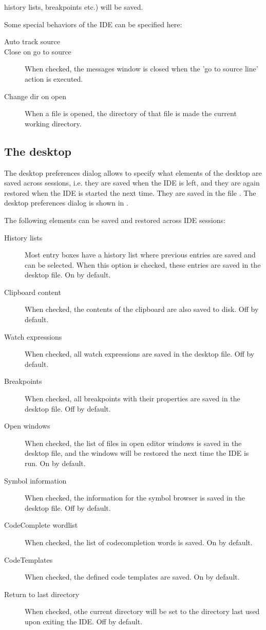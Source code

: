 \begin{description}
\begin{description}
history lists, breakpoints etc.) will be saved.
\end{description}
\item[Options]
Some special behaviors of the IDE can be specified here:
\begin{description}
\item[Auto track source]
\item[Close on go to source] When checked, the messages window is closed
when the 'go to source line' action is executed.
\item[Change dir on open] When a file is opened, the directory of that file
is made the current working directory.
\end{description}
\end{description}
%
%
\subsection{The desktop}
\label{se:prefdesktop}
The desktop preferences dialog allows to specify what elements of the
desktop are saved across sessions, i.e. they are saved when the IDE is left,
and they are again restored when the IDE is started the next time.
They are saved in the file .
The desktop preferences dialog is shown in .


The following elements can be saved and restored across IDE sessions:
\begin{description}
\item[History lists] Most entry boxes have a history list where previous
entries are saved and can be selected. When this option is checked, these
entries are saved in the desktop file. On by default.
\item[Clipboard content]
When checked, the contents of the clipboard are also saved to disk. Off by
default.
\item[Watch expressions]
When checked, all watch expressions are saved in the desktop file. Off by
default.
\item[Breakpoints]
When checked, all breakpoints with their properties are saved in the
desktop file. Off by default.
\item[Open windows]
When checked, the list of files in open editor windows is saved in the
desktop file, and the windows will be restored the next time the IDE
is run. On by default.
\item[Symbol information]
When checked, the information for the symbol browser is saved in the desktop
file. Off by default.
\item[CodeComplete wordlist]
When checked, the list of codecompletion words is saved. On by default.
\item[CodeTemplates]
When checked, the defined code templates are saved. On by default.
\item[Return to last directory]
When checked, othe current directory will be set to the directory last
used upon exiting the IDE. Off by default.
\end{description}

